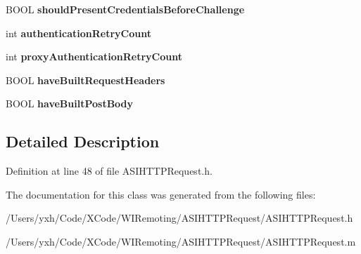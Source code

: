 \begin{DoxyCompactItemize}
\item 
\hypertarget{interface_a_s_i_h_t_t_p_request_a8978423b1982add33aff4c7dcd69dd11}{
BOOL {\bfseries shouldPresentCredentialsBeforeChallenge}}
\label{interface_a_s_i_h_t_t_p_request_a8978423b1982add33aff4c7dcd69dd11}

\item 
\hypertarget{interface_a_s_i_h_t_t_p_request_ab46c6643da18fc20cd709c7ec8fd982f}{
int {\bfseries authenticationRetryCount}}
\label{interface_a_s_i_h_t_t_p_request_ab46c6643da18fc20cd709c7ec8fd982f}

\item 
\hypertarget{interface_a_s_i_h_t_t_p_request_af8ba258b08d290b6c301902b2a1a4676}{
int {\bfseries proxyAuthenticationRetryCount}}
\label{interface_a_s_i_h_t_t_p_request_af8ba258b08d290b6c301902b2a1a4676}

\item 
\hypertarget{interface_a_s_i_h_t_t_p_request_a977d6c3b6f20704185b4c29fefc5b216}{
BOOL {\bfseries haveBuiltRequestHeaders}}
\label{interface_a_s_i_h_t_t_p_request_a977d6c3b6f20704185b4c29fefc5b216}

\item 
\hypertarget{interface_a_s_i_h_t_t_p_request_aa709c26bad7ac8b7ddeb6f4a67298233}{
BOOL {\bfseries haveBuiltPostBody}}
\label{interface_a_s_i_h_t_t_p_request_aa709c26bad7ac8b7ddeb6f4a67298233}

\end{DoxyCompactItemize}


\subsection{Detailed Description}


Definition at line 48 of file ASIHTTPRequest.h.

The documentation for this class was generated from the following files:\begin{DoxyCompactItemize}
\item 
/Users/yxh/Code/XCode/WIRemoting/ASIHTTPRequest/ASIHTTPRequest.h\item 
/Users/yxh/Code/XCode/WIRemoting/ASIHTTPRequest/ASIHTTPRequest.m\end{DoxyCompactItemize}
